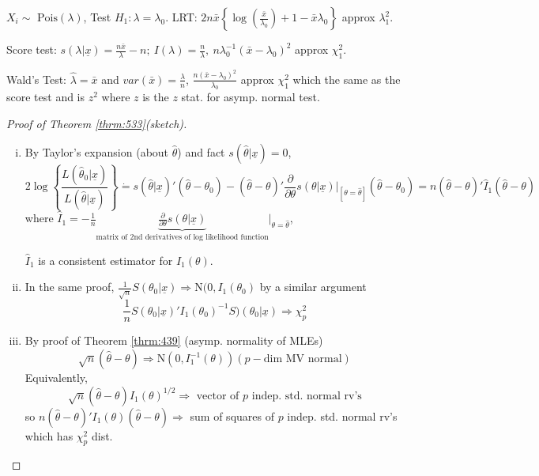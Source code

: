 \documentclass[english, 11pt]{article}
\newcommand{\lp}{\left(}
\newcommand{\rp}{\right)}
\begin{document}
\begin{exmp}
$X_i\sim\text{ Pois}(\lambda)$, Test $H_1:\lambda=\lambda_0$. LRT: $2n\bar{x}\left\{\log\lp\frac{\bar{x}}{\lambda_0}\rp+1-\bar{x}{\lambda_0}\right\}$ approx $\lambda_1^2$.

Score test: $s(\lambda|\underline{x})=\frac{n\bar{x}}{\lambda}-n;~I(\lambda)=\frac{n}{\lambda}, ~n\lambda_0^{-1}(\bar{x}-\lambda_0)^2$ approx $\chi_1^2$.

Wald's Test: $\hat{\lambda}=\bar{x}$ and $var(\bar{x})=\frac{\lambda}{n}$, $\frac{n(\bar{x}-\lambda_0)^2}{\lambda_0}$ approx $\chi_1^2$ which the same as the score test and is $z^2$ where $z$ is the $z$ stat. for asymp. normal test.
\end{exmp}
\begin{proof}[Proof of Theorem \ref{thrm:533}(sketch)]
\begin{enumerate}[i)]
\item By Taylor's expansion (about $\hat{\theta}$) and fact $s(\hat{\theta}|\underline{x})=0$, 
$$
2\log\left\{\frac{L(\hat{\theta}_0|\underline{x})}{L(\hat{\theta}|\underline{x})}\right\}\dot{=}s(\hat{\theta}|\underline{x})'(\hat{\theta}-\theta_0)-(\hat{\theta}-\theta)'\frac{\partial}{\partial\theta}s(\theta|\underline{x})\big|_[\theta=\hat{\theta}](\hat{\theta}-\theta_0)=n(\hat{\theta}-\theta)'\hat{I}_1(\hat{\theta}-\theta)
$$
where $\hat{I}_1=-\frac{1}{n}\underbrace{\frac{\partial}{\partial\theta}s(\theta|\underline{x})}_{\text{matrix of 2nd derivatives of log likelihood function}}\big|_{\theta=\hat{\theta}}$, 

$\hat{I}_1$ is a consistent estimator for $I_1(\theta)$.
\item In the same proof, $\frac{1}{\sqrt{n}}S(\theta_0|\underline{x})\Rightarrow \text{N}(0, I_1(\theta_0)$ by a similar argument
$$
\frac{1}{n}S(\theta_0|\underline{x})'I_1(\theta_0)^{-1}S)(\theta_0|\underline{x})\Rightarrow\chi^2_p
$$
\item By proof of Theorem \ref{thrm:439} (asymp. normality of MLEs)
$$
\sqrt{n}(\hat{\theta}-\theta)\Rightarrow\text{N}(0, I_1^{-1}(\theta))(p-\text{dim MV normal})
$$
Equivalently, 
$$
\sqrt{n}(\hat{\theta}-\theta)I_1(\theta)^{1/2}\Rightarrow\text{ vector of $p$ indep. std. normal rv's}
$$
so $n(\hat{\theta}-\theta)'I_1(\theta)(\hat{\theta}-\theta)\Rightarrow$ sum of squares of $p$ indep. std. normal rv's which has $\chi^2_p$ dist.
\end{enumerate}
\end{proof}
\end{document}
